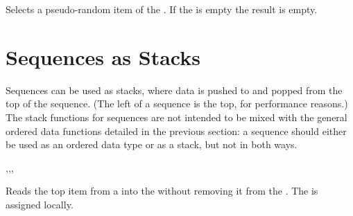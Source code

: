 \documentclass[oneside]{book}
\let\tn=\cs
\begin{document}
\begin{function}{\SeqVarRandItem}
\begin{syntax}
 
\end{syntax}
Selects a pseudo-random item of the . If the
 is empty the result is empty.
\begin{demohigh}
\SeqSetFromClist {}
\TlSet \lTmpaTl {\SeqVarRandItem \lTmpaSeq}
\TlUse \lTmpaTl
\TlSet \lTmpaTl {\SeqVarRandItem \lTmpaSeq}
\TlUse \lTmpaTl
\end{demohigh}
\end{function}

\section{Sequences as Stacks}

Sequences can be used as stacks, where data is pushed to and popped
from the top of the sequence. (The left of a sequence is the top, for
performance reasons.) The stack functions for sequences are not
intended to be mixed with the general ordered data functions detailed
in the previous section: a sequence should either be used as an
ordered data type or as a stack, but not in both ways.

\begin{function}{\SeqGet,\SeqGetT,\SeqGetF,\SeqGetTF}
\begin{syntax}
  
   
   
    
\end{syntax}
Reads the top item from a  into the
 without removing it from the
. The  is assigned locally.
\begin{demohigh}
\SeqSetFromClist {}
\SeqGet \lTmpaSeq \lTmpaTl
\TlUse \lTmpaTl
\end{demohigh}
\end{function}
\end{document}
